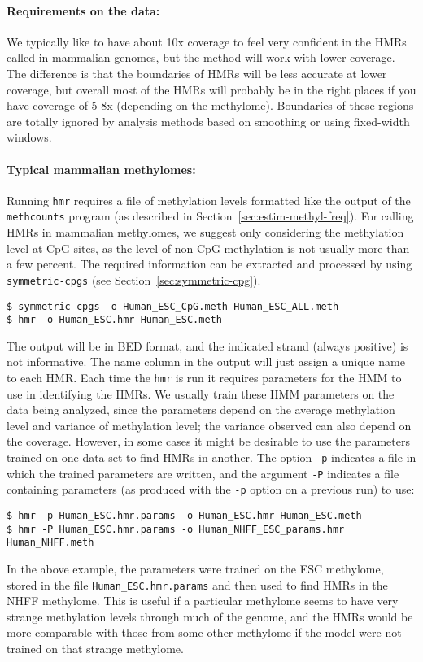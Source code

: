 \documentclass[10pt]{article}
\newcommand{\prog}[1]{\texttt{#1}}
\newcommand{\fn}[1]{\texttt{#1}}
\newcommand{\op}[1]{\texttt{#1}}
\begin{document}
\paragraph{Requirements on the data:}
We typically like to have about 10x coverage to feel very confident in
the HMRs called in mammalian genomes, but the method will work with
lower coverage. The difference is that the boundaries of HMRs will be
less accurate at lower coverage, but overall most of the HMRs will
probably be in the right places if you have coverage of 5-8x
(depending on the methylome). Boundaries of these regions are totally
ignored by analysis methods based on smoothing or using fixed-width
windows.

\paragraph{Typical mammalian methylomes:}
Running \prog{hmr} requires a file of methylation levels formatted
like the output of the \prog{methcounts} program (as described
in Section~\ref{sec:estim-methyl-freq}). 
For calling HMRs in mammalian methylomes, we suggest only
considering the methylation level at CpG sites, as the level of non-CpG
methylation is not usually more than a few percent. The required information
can be extracted and processed by using \texttt{symmetric-cpgs} 
(see Section~\ref{sec:symmetric-cpg}). 

\begin{verbatim}
$ symmetric-cpgs -o Human_ESC_CpG.meth Human_ESC_ALL.meth
$ hmr -o Human_ESC.hmr Human_ESC.meth
\end{verbatim}
The output will be in BED format, and the indicated strand (always
positive) is not informative. The name column in the output will just
assign a unique name to each HMR. Each time the \prog{hmr} is run it
requires parameters for the HMM to use in identifying the HMRs. We
usually train these HMM parameters on the data being analyzed, since
the parameters depend on the average methylation level and variance of
methylation level; the variance observed can also depend on the
coverage. However, in some cases it might be desirable to use the
parameters trained on one data set to find HMRs in another. The option
\op{-p} indicates a file in which the trained parameters are written,
and the argument \op{-P} indicates a file containing parameters (as
produced with the \op{-p} option on a previous run) to use:
\begin{verbatim}
$ hmr -p Human_ESC.hmr.params -o Human_ESC.hmr Human_ESC.meth
$ hmr -P Human_ESC.hmr.params -o Human_NHFF_ESC_params.hmr Human_NHFF.meth
\end{verbatim}
In the above example, the parameters were trained on the ESC
methylome, stored in the file \fn{Human\_ESC.hmr.params} and then
used to find HMRs in the NHFF methylome.
This is useful if a particular methylome
seems to have very strange methylation levels through much of the
genome, and the HMRs would be more comparable with those from some
other methylome if the model were not trained on that strange
methylome.
\end{document}
